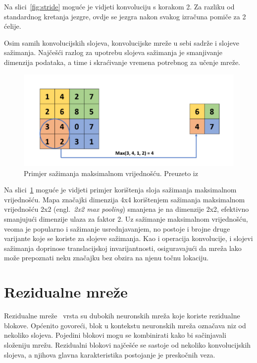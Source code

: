 \documentclass[times, utf8, zavrsni, numeric]{fer}
\begin{document}
Na slici~\ref{fig:stride} moguće je vidjeti konvoluciju s korakom 2. Za razliku od standardnog kretanja jezgre, ovdje se jezgra nakon svakog izračuna pomiče za 2 ćelije. 

Osim samih konvolucijskih slojeva, konvolucijske mreže u sebi sadrže i slojeve sažimanja. 
Najčešći razlog za upotrebu slojeva sažimanja je smanjivanje dimenzija podataka, a time i skraćivanje vremena potrebnog za učenje mreže.

\begin{figure}[htb]
    \centering
    \includegraphics[scale=0.35]{maxpool.png}
    \caption{Primjer sažimanja maksimalnom vrijednošću. Preuzeto iz~\cite{gholamalinezhad2020pooling}}
    \label{fig:maxpool}
\end{figure}

Na slici~\ref{fig:maxpool} moguće je vidjeti primjer korištenja sloja sažimanja maksimalnom vrijednošću.
Mapa značajki dimenzija 4x4 korištenjem sažimanja maksimalnom vrijednošću 2x2 (engl.\ \textit{2x2 max pooling}) smanjena je na dimenzije 2x2, efektivno smanjujući dimenzije ulaza za faktor 2.
Uz sažimanje maksimalnom vrijednošću, veoma je popularno i sažimanje usrednjavanjem, no postoje i brojne druge varijante koje se koriste za slojeve sažimanja.
Kao i operacija konvolucije, i slojevi sažimanja doprinose translacijskoj invarijantnosti, osiguravajući da mreža lako može prepoznati neku značajku bez obzira na njenu točnu lokaciju.

\section{Rezidualne mreže}

Rezidualne mreže~\cite{he2016deep} vrsta su dubokih neuronskih mreža koje koriste rezidualne blokove. Općenito govoreći, blok u kontekstu neuronskih mreža označava niz od nekoliko slojeva. 
Pojedini blokovi mogu se kombinirati kako bi sačinjavali složeniju mrežu. 
Rezidualni blokovi najčešće se sastoje od nekoliko konvolucijskih slojeva, a njihova glavna karakteristika postojanje je preskočnih veza.
\end{document}
